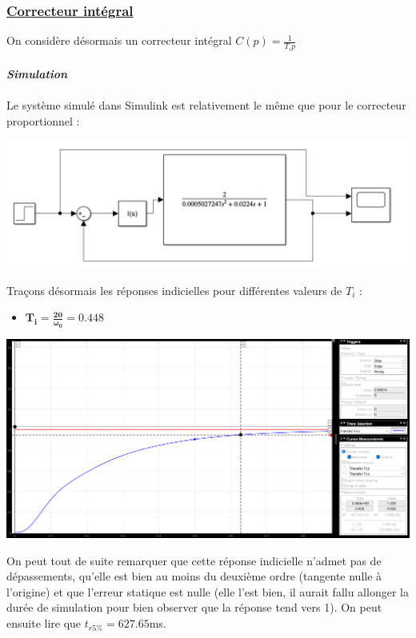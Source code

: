 \documentclass[12pt]{article}
\begin{document}
\subsubsection{\underline{\bf Correcteur intégral}}

On considère désormais un correcteur intégral $C(p) = \frac{1}{T_ip}$
\\\\\Large \textit{ \textbf{Simulation}} 
\\\\\normalsize Le système simulé dans Simulink est relativement le même que pour le correcteur proportionnel : 
\begin{center}
    \includegraphics[width = 15 cm]{TP2 Simulink/Syst_2/Syst_2_Simulink_I.png}
\end{center}

Traçons désormais les réponses indicielles pour différentes valeurs de $T_i$ : 
\begin{itemize}
    \item \large $\mathbf{T_i = \frac{20}{\omega_0} = 0.448}$
\end{itemize}

\begin{center}
    \includegraphics[width = 19 cm]{TP2 Simulink/Syst_2/tr5prct_4.2_Ti=20_sur_omega0.png}

\end{center}
On peut tout de suite remarquer que cette réponse indicielle n'admet pas de dépassements, qu'elle est bien au moins du deuxième ordre (tangente nulle à l'origine) et que l'erreur statique est nulle (elle l'est bien, il aurait fallu allonger la durée de simulation pour bien observer que la réponse tend vers 1).
On peut ensuite lire que $t_{r5\%} = 627.65$ms.
\end{document}
